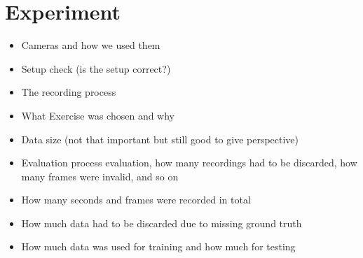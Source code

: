 \chapter{Experiment}
\label{sec:experiment}

\begin{itemize}
  \item Cameras and how we used them
  \item Setup check (is the setup correct?)
  \item The recording process
  \item What Exercise was chosen and why
  \item Data size (not that important but still good to give perspective)
  \item Evaluation process evaluation, how many recordings had to be discarded, how many frames were invalid, and so on
  \item How many seconds and frames were recorded in total
  \item How much data had to be discarded due to missing ground truth
  \item How much data was used for training and how much for testing
\end{itemize}